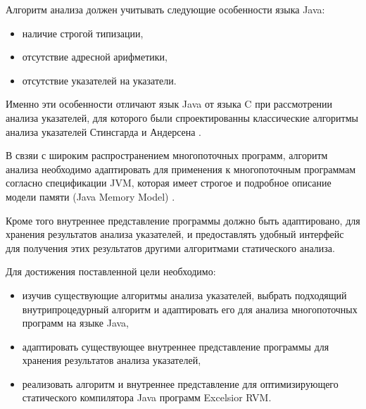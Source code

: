 \documentclass[14pt,titlepage]{extarticle}
\newcommand{\eng}[1]{{\English#1}}
\begin{document}
    Алгоритм анализа должен учитывать следующие особенности языка Java:
    \begin{itemize}
      \item наличие строгой типизации,
      \item отсутствие адресной арифметики,
      \item отсутствие указателей на указатели.
    \end{itemize}
    Именно эти особенности отличают язык Java от языка C при рассмотрении
    анализа указателей, для которого были
    спроектированны классические алгоритмы анализа указателей
    Стинсгарда \cite{steensgaard} и Андерсена \cite{andersen}.

    В свзяи с широким распространением многопоточных программ,
    алгоритм анализа необходимо адаптировать для применения к
    многопоточным программам согласно спецификации JVM, которая имеет
    строгое и подробное описание модели памяти (Java Memory Model)
    \cite{manson_jmm}.

    Кроме того внутреннее представление программы должно быть адаптировано,
    для хранения результатов анализа указателей, и предоставлять удобный
    интерфейс для получения этих результатов другими алгоритмами статического
    анализа.

    Для достижения поставленной цели необходимо:
    \begin{itemize}
      \item изучив существующие алгоритмы анализа указателей, выбрать
            подходящий внутрипроцедурный алгоритм и адаптировать его
            для анализа многопоточных программ на языке Java,
      \item адаптировать существующее внутреннее представление программы для
            хранения результатов анализа указателей,
      \item реализовать алгоритм и внутреннее представление для оптимизирующего
            статического компилятора Java программ \eng{Excelsior RVM}.
    \end{itemize}
\end{document}
